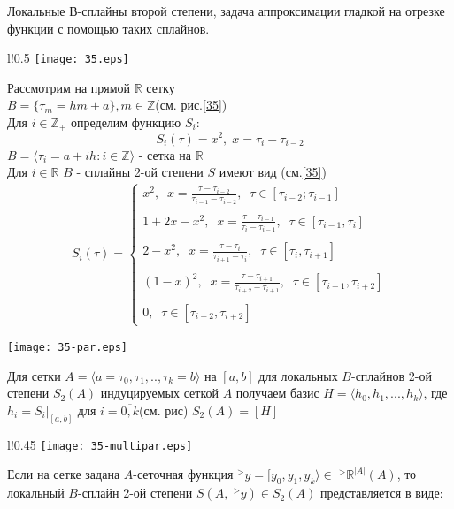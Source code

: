 \documentclass[__main__.tex]{subfiles}
\begin{document}
Локальные В-сплайны второй степени, задача аппроксимации гладкой на отрезке функции с помощью таких сплайнов.\\

\begin{wrapfigure}{l!}{0.5\linewidth}
	\texttt{[image: 35.eps]}
	\label{35}
	\caption{ }
\end{wrapfigure}
Рассмотрим на прямой $\underline{\mathbb{R}}$ сетку\\ $B = \{\tau_m = hm + a\}, m \in \mathbb{Z}$(см. рис.\ref{35})\\
Для $i \in \mathbb{Z}_+$ определим функцию $S_i$:
$$
S_i(\tau) = x^2, \; x = \tau_i - \tau_{i-2}
$$
$B = \langle\tau_i = a + ih: i \in \mathbb{Z}\rangle$ - сетка на  $\mathbb{R}$\\
Для $i \in \mathbb{R}$ $B$ - сплайны 2-ой степени $S$ имеют вид (см.\ref{35})
\begin{gather*}
	S_i(\tau) = 
	\begin{cases}
		x^2, \;\; x = \frac{\tau - \tau_{i-2}}{\tau_{i-1} - \tau_{i-2}}, \;\; \tau \in [\tau_{i-2}; \tau_{i-1}]\\\\
		1 + 2x - x^2, \;\; x = \frac{\tau - \tau_{i-1}}{\tau_i - \tau_{i-1}}, \;\; \tau \in [\tau_{i-1}, \tau_i]\\\\
		2 - x^2, \;\; x = \frac{\tau - \tau_{i}}{\tau_{i+1} - \tau_{i}}, \;\; \tau \in [\tau_{i}, \tau_{i+1}]\\\\
		(1 - x)^2, \;\; x = \frac{\tau - \tau_{i+1}}{\tau_{i+2} - \tau_{i+1}}, \;\; \tau \in [\tau_{i+1}, \tau_{i+2}]\\\\
		0, \;\; \tau \in [\tau_{i-2}, \tau_{i+2}]
	\end{cases}
\end{gather*}
\begin{center}
	\texttt{[image: 35-par.eps]}
	\label{35-par}
\end{center}
Для сетки $A = \langle a = \tau_0, \tau_1, .., \tau_k = b\rangle$ на $[a, b]$ для локальных $B$-сплайнов 2-ой степени $S_2(A)$ индуцируемых сеткой $A$ получаем базис $H = \langle h_0, h_1, ..., h_k \rangle$, где $h_i = S_i|_{[a, b]}$ для $i = \overline{0, k}$(см. рис) $S_2(A) = [H]$
\newpage
\begin{wrapfigure}[13]{l!}{0.45\linewidth}
	\texttt{[image: 35-multipar.eps]}
	\label{35-multipar}
\end{wrapfigure}
Если на сетке задана $Α$-сеточная функция $^>y = [y_0, y_1, y_k\rangle \in\; ^> \mathbb{R}^{|A|}(A)$, то локальный $B$-сплайн 2-ой степени $S(A, \;^>y) \in S_2(A)$ представляется в виде:
\end{document}

